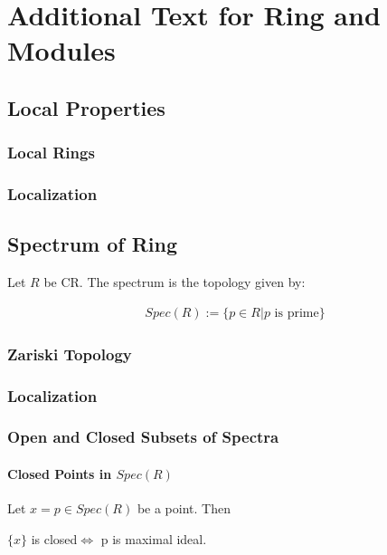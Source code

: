 \documentclass[Total.tex]{subfiles}
\begin{document}
	\chapter{Additional Text for Ring and Modules}
		\section{Local Properties}
			\subsection{Local Rings}
			\subsection{Localization}
		\section{Spectrum of Ring}
			\begin{Def}
				Let $R$ be CR. The spectrum is the topology given by:
				
				\begin{gather*}
					Spec(R):=\{p\in R|p\mbox{ is prime}\}
				\end{gather*}
			\end{Def}
			
			\subsection{Zariski Topology}
			
				\begin{Def}
					
				\end{Def}
		
			\subsection{Localization}
			\subsection{Open and Closed Subsets of Spectra}
			
				\subsubsection{Closed Points in $Spec(R)$}
				
					\begin{proposition}
						Let $x=p\in Spec(R)$ be a point. Then
						
						\begin{center}
							$\{x\}$ is closed$\Leftrightarrow$ p is maximal ideal.
						\end{center}
					\end{proposition}
					
\end{document}
